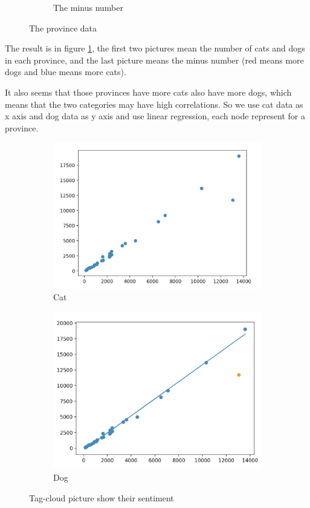 \documentclass[12pt]{article}
\begin{document}
\begin{figure}[h!]
\begin{subfigure}[b]{0.3\linewidth}
  \caption{The minus number}
  \end{subfigure}
  \caption{The province data}
  \label{fig:prov}
\end{figure}

The result is in figure \ref{fig:prov}, the first two pictures mean the number of cats and dogs in each province, and the last picture means the minus number (red means more dogs and blue means more cats).

It also seems that those provinces have more cats also have more dogs, which means that the two categories may have high correlations. So we use cat data as x axis and dog data as y axis and use linear regression, each node represent for a province.

\begin{figure}[h!]
  \centering
  \begin{subfigure}[b]{0.43\linewidth}
    \includegraphics[width=\linewidth]{../Province/plot.png}
    \caption{Cat}
  \end{subfigure}
  \begin{subfigure}[b]{0.4\linewidth}
    \includegraphics[width=\linewidth]{../Province/regression.png}
    \caption{Dog}
  \end{subfigure}
  \caption{Tag-cloud picture show their sentiment}
  \label{fig:regression}
\end{figure}
\end{document}
